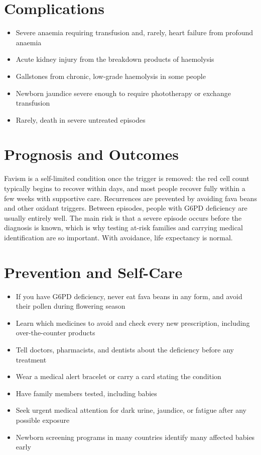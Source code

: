 \section*{Complications}
\begin{itemize}
    \item Severe anaemia requiring transfusion and, rarely, heart failure from profound anaemia
    \item Acute kidney injury from the breakdown products of haemolysis
    \item Gallstones from chronic, low-grade haemolysis in some people
    \item Newborn jaundice severe enough to require phototherapy or exchange transfusion
    \item Rarely, death in severe untreated episodes
\end{itemize}

\section*{Prognosis and Outcomes}
Favism is a self-limited condition once the trigger is removed: the red cell count typically begins to recover within days, and most people recover fully within a few weeks with supportive care. Recurrences are prevented by avoiding fava beans and other oxidant triggers. Between episodes, people with G6PD deficiency are usually entirely well. The main risk is that a severe episode occurs before the diagnosis is known, which is why testing at-risk families and carrying medical identification are so important. With avoidance, life expectancy is normal.

\section*{Prevention and Self-Care}
\begin{itemize}
    \item If you have G6PD deficiency, never eat fava beans in any form, and avoid their pollen during flowering season
    \item Learn which medicines to avoid and check every new prescription, including over-the-counter products
    \item Tell doctors, pharmacists, and dentists about the deficiency before any treatment
    \item Wear a medical alert bracelet or carry a card stating the condition
    \item Have family members tested, including babies
    \item Seek urgent medical attention for dark urine, jaundice, or fatigue after any possible exposure
    \item Newborn screening programs in many countries identify many affected babies early
\end{itemize}

